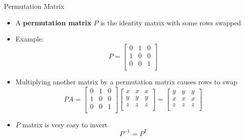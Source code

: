 \documentclass[10pt]{beamer}
\begin{document}
\begin{frame}{Permutation Matrix}

\begin{itemize}
    \item A \textbf{permutation matrix} $P$ is the identity matrix with some rows swapped
    \vfill 
    \item Example: 
    $$
    P =   \begin{bmatrix}
    0 & 1 & 0\\
    1 & 0 & 0\\
    0 & 0 & 1\\
    \end{bmatrix}
    $$
    \vfill 

    \item Multiplying another matrix by a permutation matrix causes rows to swap
        $$PA = 
    \begin{bmatrix}
    0 & 1 & 0\\
    1 & 0 & 0\\
    0 & 0 & 1\\
    \end{bmatrix}
\begin{bmatrix}
x&x & x\\
y & y & y\\
z & z & z\\
\end{bmatrix} =
\begin{bmatrix}
y & y & y\\
x & x & x\\
z & z & z\\
\end{bmatrix}
    $$
    \vfill

    \item $P$ matrix is very easy to invert
    $$
        P^{-1} = P^T
    $$

\end{itemize}
\end{frame}

\end{document}
